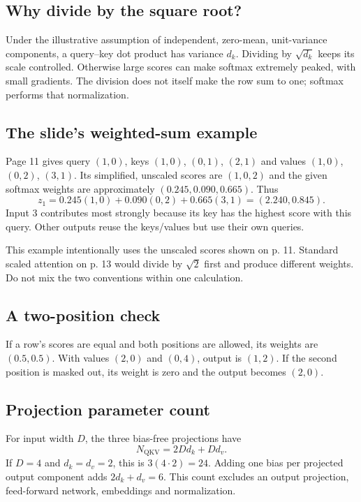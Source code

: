 \documentclass[11pt]{article}
\begin{document}
\subsection{Why divide by the square root?}
Under the illustrative assumption of independent, zero-mean, unit-variance components, a query--key dot product has variance $d_k$. Dividing by $\sqrt{d_k}$ keeps its scale controlled. Otherwise large scores can make softmax extremely peaked, with small gradients. The division does not itself make the row sum to one; softmax performs that normalization.

\subsection{The slide's weighted-sum example}
Page 11 gives query $(1,0)$, keys $(1,0)$, $(0,1)$, $(2,1)$ and values $(1,0)$, $(0,2)$, $(3,1)$. Its simplified, unscaled scores are $(1,0,2)$ and the given softmax weights are approximately $(0.245,0.090,0.665)$. Thus
\[
z_1=0.245(1,0)+0.090(0,2)+0.665(3,1)
   =(2.240,0.845).
\]
Input 3 contributes most strongly because its key has the highest score with this query. Other outputs reuse the keys/values but use their own queries.

This example intentionally uses the unscaled scores shown on p. 11. Standard scaled attention on p. 13 would divide by $\sqrt{2}$ first and produce different weights. Do not mix the two conventions within one calculation.

\subsection{A two-position check}
If a row's scores are equal and both positions are allowed, its weights are $(0.5,0.5)$. With values $(2,0)$ and $(0,4)$, output is $(1,2)$. If the second position is masked out, its weight is zero and the output becomes $(2,0)$.

\subsection{Projection parameter count}
For input width $D$, the three bias-free projections have
\[
N_{\mathrm{QKV}}=2Dd_k+Dd_v.
\]
If $D=4$ and $d_k=d_v=2$, this is $3(4\cdot2)=24$. Adding one bias per projected output component adds $2d_k+d_v=6$. This count excludes an output projection, feed-forward network, embeddings and normalization.
\end{document}

